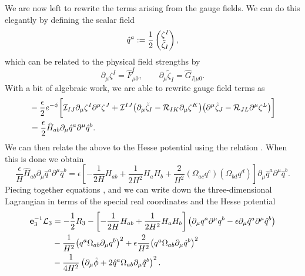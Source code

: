 We are now left to rewrite the terms arising from the gauge fields. We can do this elegantly by defining the scalar field
\begin{equation}
\hat{q}^a := \frac{1}{2}\begin{pmatrix} \zeta^I \\ \tilde{\zeta}_I \end{pmatrix},
\end{equation}
which can be related to the physical field strengths by
\begin{equation}
 \partial_\mu \zeta^I = \hat{F}^I_{\mu 0}, \qquad \partial_\mu \tilde{\zeta}_I = \hat{G}_{I|\mu 0}.
\end{equation}
With a bit of algebraic work, we are able to rewrite gauge field terms as
\begin{equation}
\begin{aligned}
 &-\frac{\epsilon }{2} e^{-\phi} \bigg[{\cal I}_{IJ} \partial_\mu \zeta^I \partial^\mu \zeta^J + {\cal I}^{IJ} \big(\partial_\mu \tilde{\zeta}_I - {\cal R}_{IK}\partial_\mu \zeta^K \big) \big(\partial^\mu \tilde{\zeta}_J - {\cal R}_{JL}\partial^\mu \zeta^L \big)\bigg] \\
 &= \frac{ \epsilon}{2} \hat{H}_{ab} \partial_\mu \hat{q}^a \partial^\mu \hat{q}^b.
\end{aligned}
\end{equation}
We can then relate the above to the Hesse potential using the relation . When this is done we obtain
\begin{equation}
\label{eq:LA3}
\frac{ \epsilon}{H}\hat{H}_{ab} \partial_\mu \hat{q}^a \partial^\mu \hat{q}^b =  \epsilon \left[ -\frac{1}{2H} H_{ab} + \frac{1}{2H^2} H_aH_b + \frac{2}{H^2} (\Omega_{ac}q^c)(\Omega_{bd}q^d) \right] \partial_\mu \hat{q}^a \partial^\mu \hat{q}^b .
\end{equation}
Piecing together equations ,  and  we can write down the three-dimensional Lagrangian in terms of the special real coordinates and the Hesse potential
\begin{equation}
\begin{aligned}
 \mathbf{e}_3^{-1} {\cal L}_3 &= - \frac{1}{2}R_3 - \left[-\frac{1}{2H} H_{ab} + \frac{1}{2H^2}H_aH_b \right]\big(\partial_\mu q^a\partial^\mu q^b - \epsilon \partial_\mu \hat{q}^a \partial^\mu \hat{q}^b \big) \\
 &- \frac{1}{H^2} \big(q^a\Omega_{ab}\partial_\mu q^b \big)^2 + \epsilon \frac{2}{H^2}\big(q^a\Omega_{ab}\partial_\mu \hat{q}^b \big)^2 \\
 &- \frac{1}{4H^2} \left(\partial_\mu \tilde{\phi} + 2\hat{q}^a \Omega_{ab} \partial_\mu \hat{q}^b \right)^2 .
\end{aligned}
\end{equation}
